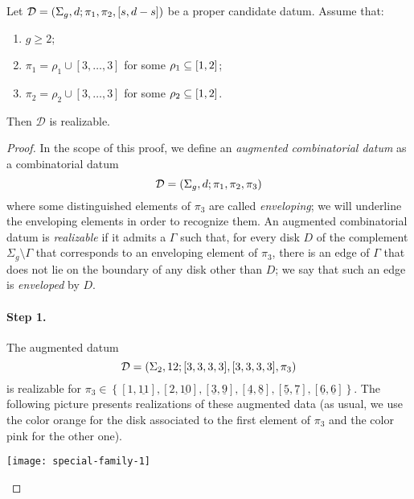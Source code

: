 \documentclass{article}
\begin{document}
\begin{lemma}\label{th:exceptional-n3-special-family}
Let $\mathcal{D}=\left(\Sigma_g,d;\pi_1,\pi_2,[s,d-s]\right)$ be a proper candidate datum. Assume that:
\begin{enumerate}
\item $g\ge 2$;
\item $\pi_1=\rho_1\cup[3,\ldots,3]$ for some $\rho_1\subseteq[1,2]$;
\item $\pi_2=\rho_2\cup[3,\ldots,3]$ for some $\rho_2\subseteq[1,2]$.
\end{enumerate}
Then $\mathcal{D}$ is realizable.
\end{lemma}
\begin{proof}
\newcommand{\env}[1]{\underline{#1}}
In the scope of this proof, we define an \emph{augmented combinatorial datum} as a combinatorial datum
\[
\mathcal{D}=\left(\Sigma_g,d;\pi_1,\pi_2,\pi_3\right)
\]
where some distinguished elements of $\pi_3$ are called \emph{enveloping}; we will underline the enveloping elements in order to recognize them. An augmented combinatorial datum is \emph{realizable} if it admits a \dessin{} $\Gamma$ such that, for every disk $D$ of the complement $\Sigma_g\setminus\Gamma$ that corresponds to an enveloping element of $\pi_3$, there is an edge of $\Gamma$ that does not lie on the boundary of any disk other than $D$; we say that such an edge is \emph{enveloped} by $D$.

\paragraph{Step 1.} The augmented datum
\[
\mathcal{D}=\left(\Sigma_2,12;[3,3,3,3],[3,3,3,3],\pi_3\right)
\]
is realizable for $\pi_3\in\left\{[1,\env{11}],[2,\env{10}],[\env{3},\env{9}],[\env{4},\env{8}],[\env{5},\env{7}],[\env{6},\env{6}]\right\}$. The following picture presents realizations of these augmented data (as usual, we use the color orange for the disk associated to the first element of $\pi_3$ and the color pink for the other one).
\begin{center}
\texttt{[image: special-family-1]}
\end{center}


\end{proof}
\end{document}
